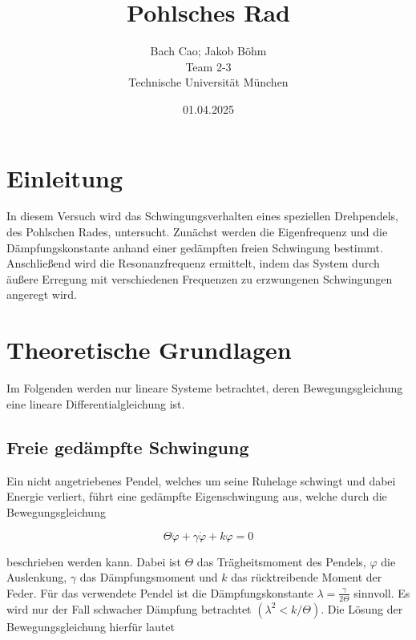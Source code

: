 \documentclass{article}
\title{Pohlsches Rad}
\author{Bach Cao; Jakob Böhm \\ 
Team 2-3 \\
Technische Universität München}
\date{01.04.2025}
\begin{document}
\maketitle
{}


\tableofcontents
{}
\newpage

\setcounter{page}{1}

\section{Einleitung}
In diesem Versuch wird das Schwingungsverhalten eines speziellen Drehpendels, des Pohlschen Rades, untersucht. Zunächst werden die Eigenfrequenz und die Dämpfungskonstante anhand einer gedämpften freien Schwingung bestimmt. Anschließend wird die Resonanzfrequenz ermittelt, indem das System durch äußere Erregung mit verschiedenen Frequenzen zu erzwungenen Schwingungen angeregt wird.




\vspace{1cm}  
\section{Theoretische Grundlagen}

Im Folgenden werden nur lineare Systeme betrachtet, deren Bewegungsgleichung eine lineare Differentialgleichung ist.



\subsection{Freie gedämpfte Schwingung}
Ein nicht angetriebenes Pendel, welches um seine Ruhelage schwingt und dabei Energie verliert, führt eine gedämpfte Eigenschwingung aus, welche durch die Bewegungsgleichung

\begin{equation}
    \Theta \ddot{\varphi} + \gamma \dot{\varphi} + k \varphi = 0
\end{equation}

beschrieben werden kann. Dabei ist $\Theta$ das Trägheitsmoment des Pendels, $\varphi$ die Auslenkung, $\gamma$ das Dämpfungsmoment und $k$ das rücktreibende Moment der Feder. Für das verwendete Pendel ist die Dämpfungskonstante $\lambda = \frac{\gamma}{2\Theta}$ sinnvoll. Es wird nur der Fall schwacher Dämpfung betrachtet $(\lambda^2 < k/\Theta)$. Die Lösung der Bewegungsgleichung hierfür lautet
\end{document}
